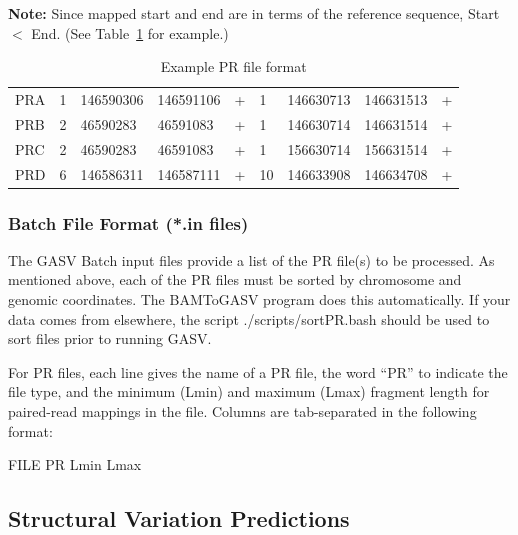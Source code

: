 \documentclass[11pt]{article}
\begin{document}
\noindent \textbf{Note:} Since mapped start and end are in terms of the reference
sequence, Start $<$ End. (See Table~\ref{tab:PRFile} for example.)
\begin{table}[h!]
   \centering
   \begin{tabular}{@{} lllllllll @{}} %
PRA  &     1    &   146590306   &    146591106   &    +    &   1& 146630713&  146631513   &    + \\
PRB  &     2  &     46590283     &  46591083    &   +    &   1& 146630714  &146631514    &   +\\
PRC  &     2    &   46590283   &    46591083 &      +     &  1& 156630714  &156631514     &  + \\
PRD  &     6    &   146586311  &     146587111   &    +  &     10 &146633908 & 146634708   &    +\\
   \end{tabular}
   \caption{Example PR file format}
   \label{tab:PRFile}
\end{table}

\subsubsection{Batch File Format (*.in files)}

The GASV Batch input files provide a list of the PR file(s) to
be processed.   As mentioned above, each of the PR files
must be sorted by chromosome and genomic coordinates.  The BAMToGASV program 
does this automatically.  If your data comes from elsewhere, the script
./scripts/sortPR.bash should be used to sort files prior to running GASV.

For PR files, each line gives the name of a PR file, the word ``PR''
to indicate the file type, and the minimum (Lmin) and maximum (Lmax)
fragment length for paired-read mappings in the file.  Columns are tab-separated in the
following format:

\begin{center} 
FILE \hspace{1cm} PR \hspace{1cm} Lmin \hspace{1cm} Lmax
\end{center}

\subsection{Structural Variation Predictions}
\end{document}
